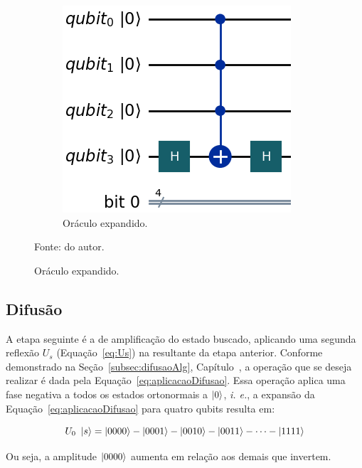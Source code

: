 \begin{figure}[!htb]
\begin{subfigure}[b]{0.25\textwidth}
        \includegraphics[width=\textwidth]{Imagens/oraculoExpandido.png}
        \caption{Oráculo expandido.}
        \label{subfig:oraculoExpandido}
    \end{subfigure}

    \vspace{0.3em}
    {\small Fonte: do autor.}
\end{figure}
%
\subsection{Difus\~{a}o}
\label{subSec: difusaoTeo}

A etapa seguinte é a de amplificação do estado buscado, aplicando uma segunda reflexão $U_s$ (Equaç\~{a}o~\ref{eq:Us}) na resultante da etapa anterior. Conforme demonstrado na Seção~\ref{subsec:difusaoAlg}, Capítulo~, a operação que se deseja realizar é dada pela Equação~\ref{eq:aplicacaoDifusao}. Essa operação aplica uma fase negativa a todos os estados ortonormais a $\ket{0}$, \emph{i. e.}, a expansão da Equação~\ref{eq:aplicacaoDifusao} para quatro qubits resulta em:

\begin{equation}
U_0~\ket{s} = \ket{0000} - \ket{0001} - \ket{0010} - \ket{0011} - \cdots - \ket{1111} 
\end{equation}

Ou seja, a amplitude $\ket{0000}$ aumenta em relação aos demais que invertem.

